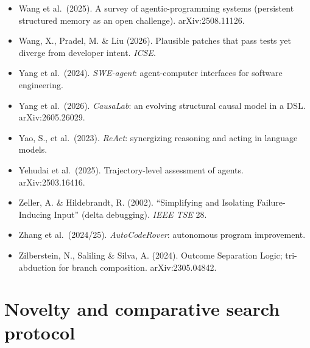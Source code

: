\documentclass[
  10pt,
]{article}
\begin{document}
\begin{itemize}
  platform for AI software developers.
\item
  Wang et al.~(2025). A survey of agentic-programming systems
  (persistent structured memory as an open challenge). arXiv:2508.11126.
\item
  Wang, X., Pradel, M. \& Liu (2026). Plausible patches that pass tests
  yet diverge from developer intent. \emph{ICSE}.
\item
  Yang et al.~(2024). \emph{SWE-agent}: agent-computer interfaces for
  software engineering.
\item
  Yang et al.~(2026). \emph{CausaLab}: an evolving structural causal
  model in a DSL. arXiv:2605.26029.
\item
  Yao, S., et al.~(2023). \emph{ReAct}: synergizing reasoning and acting
  in language models.
\item
  Yehudai et al.~(2025). Trajectory-level assessment of agents.
  arXiv:2503.16416.
\item
  Zeller, A. \& Hildebrandt, R. (2002). ``Simplifying and Isolating
  Failure-Inducing Input'' (delta debugging). \emph{IEEE TSE} 28.
\item
  Zhang et al.~(2024/25). \emph{AutoCodeRover}: autonomous program
  improvement.
\item
  Zilberstein, N., Saliling \& Silva, A. (2024). Outcome Separation
  Logic; tri-abduction for branch composition. arXiv:2305.04842.
\end{itemize}

\section{Novelty and comparative search protocol}\label{search}
\end{document}
